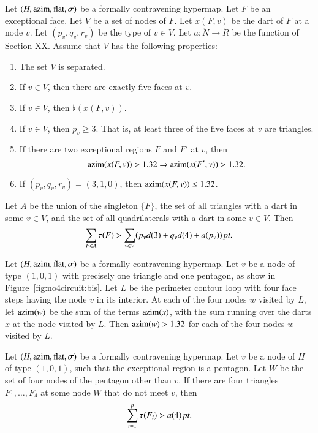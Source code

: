 \begin{lemma} \label{lemma:excess-1:bis}
Let $(H,{\operatorname{azim}},\operatorname{flat},\sigma)$ be a formally contravening hypermap.
Let $F$ be an exceptional face.  Let $V$ be a set of nodes of $F$.
Let $x(F,v)$ be the dart of $F$ at a node $v$.  Let $(p_v,q_v,r_v)$
be the type of $v\in V$.   Let $a:\ring{N}\to\ring{R}$ be the
function of Section XX. Assume that $V$ has the following
properties:
    \begin{enumerate}
        \item The set $V$ is separated.
        \item If $v\in V$, then there are exactly five faces at
        $v$.
        \item If $v\in V$, then $\flat(x(F,v))$.
        \item If $v\in V$, then $p_v\ge 3$.  That is, at least
        three of the five faces at $v$ are triangles.
        \item If there are two exceptional regions $F$ and $F'$ at
        $v$, then
            $${\operatorname{azim}}(x(F,v)) > 1.32 \Rightarrow {\operatorname{azim}}(x(F',v)) > 1.32.$$
        \item If $(p_v,q_v,r_v)=(3,1,0)$, then ${\operatorname{azim}}(x(F,v))\le 1.32$.
    \end{enumerate}
Let $A$ be the union of the singleton $\{F\}$, the set of all
triangles with a dart in some $v\in V$, and the set of all
quadrilaterals with a dart in some $v\in V$. Then
    $$\sum_{F\in A}\tau(F) > \sum_{v\in V} (p_v d(3) + q_v d(4) + a
    (p_v))\,\hbox{\it pt}.$$
\end{lemma}


\begin{lemma}\label{lemma:nobad4}
Let $(H,{\operatorname{azim}},\operatorname{flat},\sigma)$ be a formally contravening hypermap.
Let $v$ be a node of type $(1,0,1)$ with precisely one triangle and
one pentagon, as show in Figure~\ref{fig:no4circuit:bis}. Let $L$ be
the perimeter contour loop with four face steps having the node $v$
in its interior.  At each of the four nodes $w$ visited by $L$, let
${\operatorname{azim}}(w)$ be the sum of the terms ${\operatorname{azim}}(x)$, with the sum running
over the darts $x$ at the node visited by $L$.  Then
    ${\operatorname{azim}}(w) > 1.32$
for each of the four nodes $w$ visited by $L$.
\end{lemma}

\begin{lemma} Let $(H,{\operatorname{azim}},\operatorname{flat},\sigma)$ be a formally contravening
hypermap.  Let $v$ be a node of $H$ of type $(1,0,1)$, such that the
exceptional region is a pentagon.  Let $W$ be the set of four nodes
of the pentagon other than $v$.  If there are four triangles
$F_1,\ldots,F_4$ at some node $W$ that do not meet $v$, then
    $$\sum_{i=1}^p \tau(F_i) > a(4)\,\hbox{\it pt}.$$
\end{lemma}

